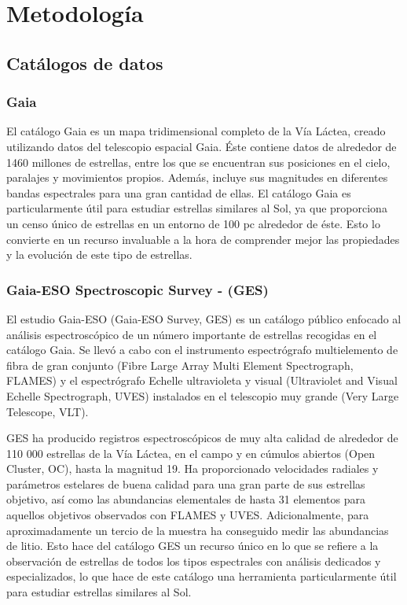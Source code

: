 
\chapter{Metodología}\label{ch:octavo-capitulo}
\section{Catálogos de datos}
\subsection{Gaia}
El catálogo Gaia \citep{Mignard2005} es un mapa tridimensional completo de la Vía Láctea, creado utilizando datos del telescopio espacial Gaia. Éste contiene datos de alrededor de 1460 millones de estrellas, entre los que se encuentran sus posiciones en el cielo, paralajes y movimientos propios. Además, incluye sus magnitudes en diferentes bandas espectrales para una gran cantidad de ellas. El catálogo Gaia es particularmente útil para estudiar estrellas similares al Sol, ya que proporciona un censo único de estrellas en un entorno de 100 pc alrededor de éste. Esto lo convierte en un recurso invaluable a la hora de comprender mejor las propiedades y la evolución de este tipo de estrellas.\par

\subsection{Gaia-ESO Spectroscopic Survey - (GES)}
El estudio Gaia-ESO (Gaia-ESO Survey, GES) \citep{Gilmore2012,Randich2013,Randich2022} es un catálogo público enfocado al análisis espectroscópico de un número importante de estrellas recogidas en el catálogo Gaia. Se llevó a cabo con el instrumento espectrógrafo multielemento de fibra de gran conjunto (Fibre Large Array Multi Element Spectrograph, FLAMES) y el espectrógrafo Echelle ultravioleta y visual (Ultraviolet and Visual Echelle Spectrograph, UVES) instalados en el telescopio muy grande (Very Large Telescope, VLT).\par

GES ha producido registros espectroscópicos de muy alta calidad de alrededor de 110 000 estrellas de la Vía Láctea, en el campo y en cúmulos abiertos (Open Cluster, OC), hasta la magnitud 19. Ha proporcionado velocidades radiales y parámetros estelares de buena calidad para una gran parte de sus estrellas objetivo, así como las abundancias elementales de hasta 31 elementos para aquellos objetivos observados con FLAMES y UVES. Adicionalmente, para aproximadamente un tercio de la muestra ha conseguido medir las abundancias de litio. Esto hace del catálogo GES un recurso único en lo que se refiere a la observación de estrellas de todos los tipos espectrales con análisis dedicados y especializados, lo que hace de este catálogo una herramienta particularmente útil para estudiar estrellas similares al Sol.\par

